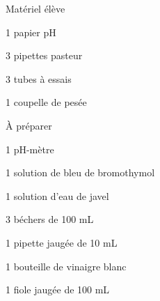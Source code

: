 
\begin{boiteMateriel}{Matériel élève}
  \effectifPremiereStss
  \begin{protocole}[2]
    \item 1 papier pH
    \item 3 pipettes pasteur
    \item 3 tubes à essais
    \item 1 coupelle de pesée
  \end{protocole}
\end{boiteMateriel}


\begin{boiteMateriel}{À préparer}
  \vspace*{4pt}
  \begin{protocole}[2]
    \item 1 pH-mètre
    \item 1 solution de bleu de bromothymol
    \item 1 solution d'eau de javel
    \item 3 béchers de 100 mL
    \item 1 pipette jaugée de 10 mL
    \item 1 bouteille de vinaigre blanc
    \item 1 fiole jaugée de 100 mL
    \item[\vspace{\fill}]
  \end{protocole}
\end{boiteMateriel}